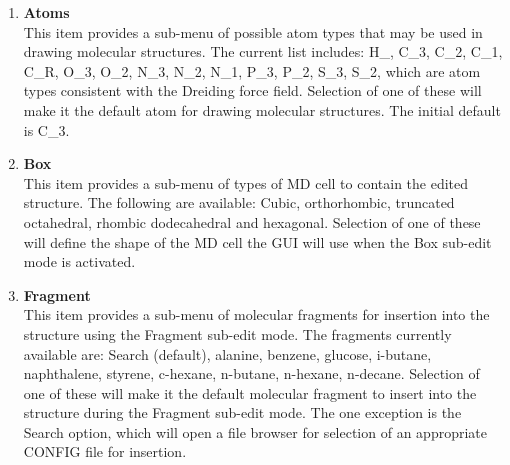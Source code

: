 \begin{enumerate}
\item {\bf Atoms}\\
  This item provides a sub-menu of possible atom types that may be used in
  drawing molecular structures. The current list includes: H\_, C\_3, C\_2, 
  C\_1, C\_R, O\_3, O\_2, N\_3, N\_2, N\_1, P\_3, P\_2, S\_3, S\_2,
  which are atom types consistent with the Dreiding force field. Selection of
  one of these will make it the default atom for drawing molecular
  structures. The initial default is C\_3.
\item {\bf Box}\\
  This item provides a sub-menu of types of MD cell to contain the edited
  structure. The following are available: Cubic, orthorhombic, truncated
  octahedral, rhombic dodecahedral and hexagonal. Selection of one of these
  will define the shape of the MD cell the GUI will use when the Box sub-edit
  mode is activated.
\item {\bf Fragment}\\
  This item provides a sub-menu of molecular fragments for insertion into the
  structure using the Fragment sub-edit mode. The fragments currently
  available are: Search (default), alanine, benzene, glucose, i-butane,
  naphthalene, styrene, c-hexane, n-butane, n-hexane, n-decane. Selection of
  one of these will make it the default molecular fragment to insert into the
  structure during the Fragment sub-edit mode. The one exception is the Search
  option, which will open a file browser for selection of an appropriate
  CONFIG file for insertion.
\end{enumerate}

